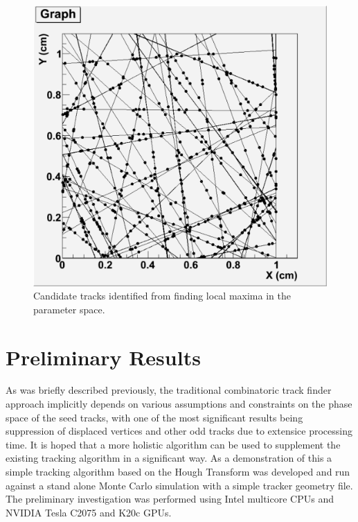 \documentclass{JINST}
\begin{document}
\begin{figure}[!Hhtb]
\begin{minipage}[t]{4.9cm}
\begin{center}
	\includegraphics[width=1.\textwidth]{figs/50events_hits_tracks.pdf}
	\caption{Candidate tracks identified from finding local maxima in the parameter space.  \label{fig:tracks}}
	\end{center}
\end{minipage}
\end{figure}

\section{Preliminary Results}

As was briefly described previously, the traditional combinatoric track finder  approach implicitly depends on various assumptions and
constraints on the phase space of the seed tracks, with one of the most significant
results being suppression of displaced vertices and other odd tracks due to extensice processing time.
 It is hoped that a more holistic algorithm
can be used to supplement the existing tracking algorithm in a significant way.
As a demonstration of this a simple tracking algorithm based on the Hough Transform was developed 
and run against a stand alone Monte Carlo simulation with a simple tracker geometry file. 
The preliminary investigation was performed using Intel multicore CPUs and NVIDIA Tesla C2075 and K20c GPUs.
\end{document}
